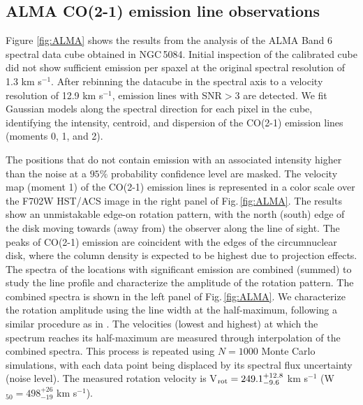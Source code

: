 \documentclass[modern]{aastex631}
\begin{document}
\subsection{ALMA CO(2-1) emission line observations}
\label{subsec:results_alma}


Figure \ref{fig:ALMA} shows the results from the analysis of the ALMA Band 6 spectral data cube obtained in NGC\,5084. Initial inspection of the calibrated cube did not show sufficient emission per spaxel at the original spectral resolution of 1.3 km s$^{-1}$. After rebinning the datacube in the spectral axis to a velocity resolution of 12.9 km s$^{-1}$, emission lines with SNR$>3$ are detected. We fit Gaussian models along the spectral direction for each pixel in the cube, identifying the intensity, centroid, and dispersion of the CO(2-1) emission lines (moments 0, 1, and 2). 

The positions that do not contain emission with an associated intensity higher than the noise at a $95\%$ probability confidence level are masked. The velocity map (moment 1) of the CO(2-1) emission lines is represented in a color scale over the F702W HST/ACS image in the right panel of Fig.\,\ref{fig:ALMA}. The results show an unmistakable edge-on rotation pattern, with the north (south) edge of the disk moving towards (away from) the observer along the line of sight. The peaks of CO(2-1) emission are coincident with the edges of the circumnuclear disk, where the column density is expected to be highest due to projection effects.\\ 

The spectra of the locations with significant emission are combined (summed) to study the line profile and characterize the amplitude of the rotation pattern. The combined spectra is shown in the left panel of Fig.\,\ref{fig:ALMA}. We characterize the rotation amplitude using the line width at the half-maximum, following a similar procedure as in \citep[W$_{50}$,][]{smith+2021mnras500_1933}. The velocities (lowest and highest) at which the spectrum reaches its half-maximum are measured through interpolation of the combined spectra. This process is repeated using $N=1000$ Monte Carlo simulations, with each data point being displaced by its spectral flux uncertainty (noise level). The measured rotation velocity is V$_{\rm rot} = 249.1^{+12.8}_{-9.6}$ km s$^{-1}$ (W$_{50}=498^{+26}_{-19}$ km s$^{-1}$).\\
\end{document}
